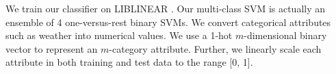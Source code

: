 We train our classifier on LIBLINEAR \cite{fan2008liblinear}. 
Our multi-class SVM is actually an ensemble of 4 one-versus-rest binary SVMs.
We convert categorical attributes such as weather into numerical values. 
We use a 1-hot $m$-dimensional binary vector to represent an
$m$-category attribute. 
Further, we linearly scale each attribute in both training and test data 
to the range [0, 1]. 

